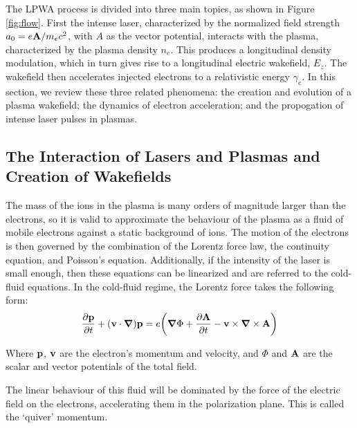 \documentclass[12pt,letter]{article}
\begin{document}
The LPWA process is divided into three main topics, as shown in Figure
\ref{fig:flow}. First the intense laser, characterized
by the normalized field strength $a_0 = e\vb{A}/m_e c^2$, with $A$ as the vector
potential, interacts with the
plasma, characterized by the plasma density $n_e$. This produces a longitudinal
density modulation, which in turn gives rise to a longitudinal electric
wakefield, $E_z$. The wakefield then accelerates injected electrons to a relativistic energy
$\gamma_e$. In this section, we review these three related phenomena: 
the creation and evolution of a plasma wakefield; the dynamics of electron
acceleration; and the propogation of intense laser pulses in plasmas. 
\subsection{The Interaction of Lasers and Plasmas and Creation of Wakefields}
\label{sec:wakefield}
The mass of the ions in the plasma is many orders of magnitude larger than the
electrons, so it is valid to approximate the behaviour of the plasma as a fluid of
mobile electrons against a static background of ions. The motion of the
electrons is then governed by the
combination of the Lorentz force law, the continuity equation, and Poisson's
equation. Additionally, if the
intensity of the laser is small enough, then these equations can be
linearized and are referred to the cold-fluid
equations\cite{gorbunov1987excitation}.
In the cold-fluid regime, the Lorentz force takes the following form:
\begin{align}
    \label{eq:fullLPWA}
    \pdv{\vb{p}}{t} +(\vb{v} \cdot \grad)\vb{p} = e \qty( \grad \Phi
    +\pdv{\vb{A}}{t} - \vb{v}\times \grad \times \vb{A} )
\end{align}

Where $\vb{p}$, $\vb{v}$ are the electron's momentum and velocity, and $\Phi$
and $\vb{A}$ are the scalar and vector potentials of the total field.

The linear behaviour of this fluid will be dominated by the force of the
electric field on the electrons, accelerating them in the polarization
plane. This is called the `quiver' momentum. 
\end{document}
